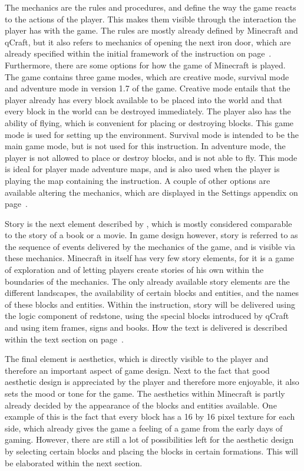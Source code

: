 \documentclass[11pt,twoside]{report} %
\begin{document}
The mechanics are the rules and procedures, and define the way the game reacts to the actions of the player. This makes them visible through the interaction the player has with the game. The rules are mostly already defined by Minecraft and qCraft, but it also refers to mechanics of opening the next iron door, which are already specified within the initial framework of the instruction on page~\pageref{app:framework1}. Furthermore, there are some options for how the game of Minecraft is played. The game contains three game modes, which are creative mode, survival mode and adventure mode in version 1.7 of the game. Creative mode entails that the player already has every block available to be placed into the world and that every block in the world can be destroyed immediately. The player also has the ability of flying, which is convenient for placing or destroying blocks. This game mode is used for setting up the environment. Survival mode is intended to be the main game mode, but is not used for this instruction. In adventure mode, the player is not allowed to place or destroy blocks, and is not able to fly. This mode is ideal for player made adventure maps, and is also used when the player is playing the map containing the instruction. A couple of other options are available altering the mechanics, which are displayed in the Settings appendix on page~\pageref{app:settings}.

Story is the next element described by , which is mostly considered comparable to the story of a book or a movie. In game design however, story is referred to as the sequence of events delivered by the mechanics of the game, and is visible via these mechanics. Minecraft in itself has very few story elements, for it is a game of exploration and of letting players create stories of his own within the boundaries of the mechanics. The only already available story elements are the different landscapes, the availability of certain blocks and entities, and the names of these blocks and entities. Within the instruction, story will be delivered using the logic component of redstone, using the special blocks introduced by qCraft and using item frames, signs and books. How the text is delivered is described within the text section on page~\pageref{subsec:devtext}.

The final element is aesthetics, which is directly visible to the player and therefore an important aspect of game design. Next to the fact that good aesthetic design is appreciated by the player and therefore more enjoyable, it also sets the mood or tone for the game. The aesthetics within Minecraft is partly already decided by the appearance of the blocks and entities available. One example of this is the fact that every block has a 16 by 16 pixel texture for each side, which already gives the game a feeling of a game from the early days of gaming. However, there are still a lot of possibilities left for the aesthetic design by selecting certain blocks and placing the blocks in certain formations. This will be elaborated within the next section.
\end{document}
